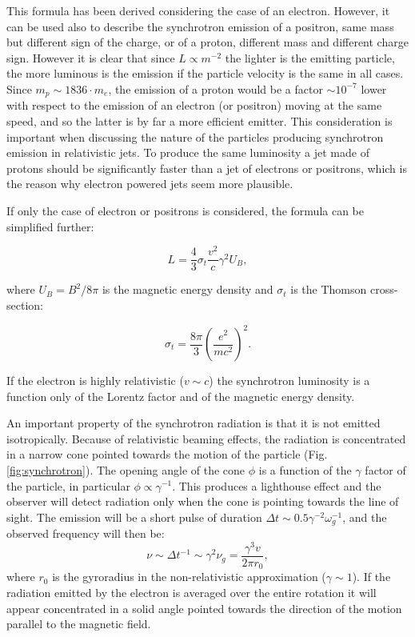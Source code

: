 \documentclass[../main.tex]{subfiles}
\begin{document}
This formula has been derived considering the case of an electron. 
However, it can be used also to describe the synchrotron emission of a positron, same mass but different sign of the charge, or of a proton, different mass and different charge sign.
However it is clear that since $L\propto m^{-2}$ the lighter is the emitting particle, the more luminous is the emission if the particle velocity is the same in all cases.
Since $m_p \sim 1836\cdot m_e$, the emission of a proton would be a factor $\sim 10^{-7}$ lower with respect to the emission of an electron (or positron) moving at the same speed, and so the latter is by far a more efficient emitter.
This consideration is important when discussing the nature of the particles producing synchrotron emission in relativistic jets.
To produce the same luminosity a jet made of protons should be significantly faster than a jet of electrons or positrons, which is the reason why electron powered jets seem more plausible.

If only the case of electron or positrons is considered, the formula can be simplified further:

\begin{equation}
    \label{eq:sync_semp}
    L=\frac{4}{3}\sigma_t\frac{v^2}{c}\gamma^2U_B,
\end{equation}

where $U_B = B^2/8\pi$ is the magnetic energy density and $\sigma_t$ is the Thomson cross-section:

\begin{equation}
    \label{eq:thomson}
    \sigma_t = \frac{8\pi}{3}\left(\frac{e^2}{mc^2}\right)^2.
\end{equation}

If the electron is highly relativistic ($v\sim c$) the synchrotron luminosity is a function only of the Lorentz factor and of the magnetic energy density.

An important property of the synchrotron radiation is that it is not emitted isotropically.
Because of relativistic beaming effects, the radiation is concentrated in a narrow cone pointed towards the motion of the particle (Fig.\,\ref{fig:synchrotron}).
The opening angle of the cone $\phi$ is a function of the $\gamma$ factor of the particle, in particular $\phi \propto \gamma^{-1}$.
This produces a lighthouse effect and the observer will detect radiation only when the cone is pointing towards the line of sight.
The emission will be a short pulse of duration $\Delta t \sim 0.5\gamma^{-2} \omega_g^{-1}$, and the observed frequency will then be:
\begin{equation}
    \label{eq:new_freq}
    \nu \sim \Delta t^{-1} \sim \gamma^2\nu_g = \frac{\gamma^3v}{2\pi r_0},
\end{equation}
where $r_0$ is the gyroradius in the non-relativistic approximation ($\gamma \sim 1$).
If the radiation emitted by the electron is averaged over the entire rotation it will appear concentrated in a solid angle pointed towards the direction of the motion parallel to the magnetic field.
\end{document}

